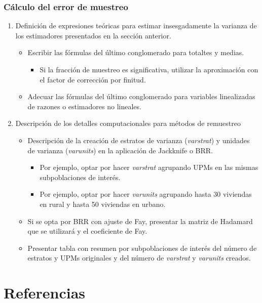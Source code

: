 \documentclass[
  10pt,
  spanish,
]{book}
\providecommand{\tightlist}{%
  \setlength{\itemsep}{0pt}\setlength{\parskip}{0pt}}
\begin{document}
\hypertarget{cuxe1lculo-del-error-de-muestreo}{%
\subsection*{Cálculo del error de muestreo}\label{cuxe1lculo-del-error-de-muestreo}}

\begin{enumerate}
\def\labelenumi{\arabic{enumi}.}
\tightlist
\item
  Definición de expresiones teóricas para estimar insesgadamente la
  varianza de los estimadores presentados en la sección anterior.

  \begin{itemize}
  \tightlist
  \item
    Escribir las fórmulas del último conglomerado para totaltes y medias.

    \begin{itemize}
    \tightlist
    \item
      Si la fracción de muestreo es significativa, utilizar la aproximación con el factor de corrección por finitud.
    \end{itemize}
  \item
    Adecuar las fórmulas del último conglomerado para variables linealizadas de razones o estimadores no lineales.
  \end{itemize}
\item
  Descripción de los detalles computacionales para métodos de remuestreo

  \begin{itemize}
  \tightlist
  \item
    Descripción de la creación de estratos de varianza (\emph{varstrat}) y unidades de varianza (\emph{varunits}) en la aplicación de Jackknife o BRR.

    \begin{itemize}
    \tightlist
    \item
      Por ejemplo, optar por hacer \emph{varstrat} agrupando UPMs en las mismas subpoblaciones de interés.
    \item
      Por ejemplo, optar por hacer \emph{varunits} agrupando hasta 30 viviendas en rural y hasta 50 viviendas en urbano.
    \end{itemize}
  \item
    Si se opta por BRR con ajuste de Fay, presentar la matriz de Hadamard que se utilizará y el coeficiente de Fay.
  \item
    Presentar tabla con resumen por subpoblaciones de interés del número de estratos y UPMs originales y del número de \emph{varstrat} y \emph{varunits} creados.
  \end{itemize}
\end{enumerate}

\hypertarget{referencias}{%
\chapter*{Referencias}\label{referencias}}

  
\end{document}
